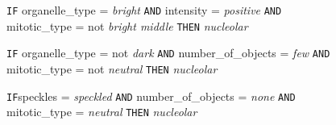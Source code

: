 \begin{figure}
\begin{algorithmic}[1]
			\State \texttt{IF} organelle\_type = \textit{bright} \texttt{AND} intensity = \textit{positive} \texttt{AND} mitotic\_type = not \textit{bright middle}
			\Statex \texttt{THEN} \textit{nucleolar}
			
			\State \texttt{IF} organelle\_type = not \textit{dark} \texttt{AND} number\_of\_objects = \textit{few} \texttt{AND} mitotic\_type = not \textit{neutral}
			\Statex \texttt{THEN} \textit{nucleolar}
			
			\State \texttt{IF}speckles = \textit{speckled} \texttt{AND} number\_of\_objects = \textit{none} \texttt{AND} mitotic\_type = \textit{neutral}
			\Statex \texttt{THEN} \textit{nucleolar}
			
		\end{algorithmic}
	
\end{figure}
